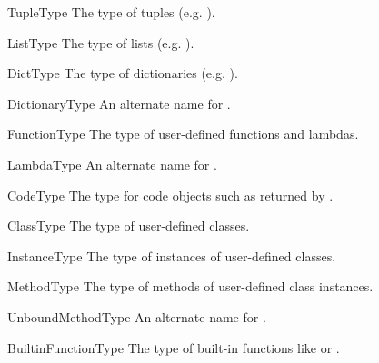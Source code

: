 \begin{datadesc}{TupleType}
The type of tuples (e.g. ).
\end{datadesc}

\begin{datadesc}{ListType}
The type of lists (e.g. \code{[0, 1, 2, 3]}).
\end{datadesc}

\begin{datadesc}{DictType}
The type of dictionaries (e.g. ).
\end{datadesc}

\begin{datadesc}{DictionaryType}
An alternate name for .
\end{datadesc}

\begin{datadesc}{FunctionType}
The type of user-defined functions and lambdas.
\end{datadesc}

\begin{datadesc}{LambdaType}
An alternate name for .
\end{datadesc}

\begin{datadesc}{CodeType}
The type for code objects such as returned by
.
\end{datadesc}

\begin{datadesc}{ClassType}
The type of user-defined classes.
\end{datadesc}

\begin{datadesc}{InstanceType}
The type of instances of user-defined classes.
\end{datadesc}

\begin{datadesc}{MethodType}
The type of methods of user-defined class instances.
\end{datadesc}

\begin{datadesc}{UnboundMethodType}
An alternate name for .
\end{datadesc}

\begin{datadesc}{BuiltinFunctionType}
The type of built-in functions like  or
.
\end{datadesc}

